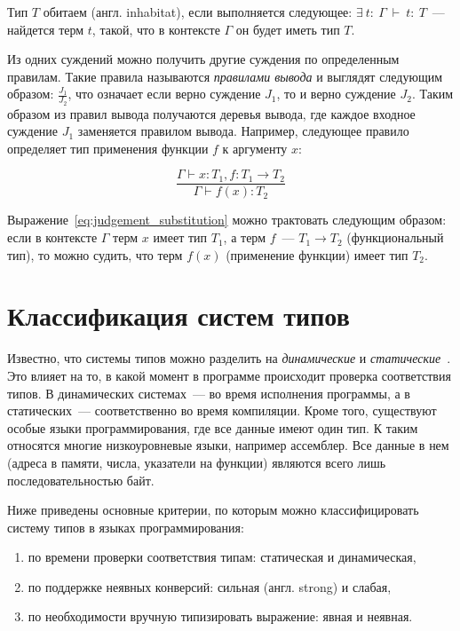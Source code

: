 Тип $T$ обитаем (англ. inhabitat), если выполняется следующее: $\exists~t:~\Gamma~\vdash~t:~T$~--- найдется терм $t$, такой, что в контексте $\Gamma$ он будет иметь тип $T$.

Из одних суждений можно получить другие суждения по определенным правилам.
Такие правила называются \textit{правилами вывода} и выглядят следующим образом: $\displaystyle \frac{J_1}{J_2}$, что означает если верно суждение $J_1$, то и верно суждение $J_2$.
Таким образом из правил вывода получаются деревья вывода, где каждое входное суждение $J_1$ заменяется правилом вывода.
Например, следующее правило определяет тип применения функции $f$ к аргументу $x$:

\begin{equation}
    \label{eq:judgement_substitution}
    \frac{\Gamma \vdash x: T_1, f: T_1 \to T_2}{\Gamma \vdash f(x): T_2}
\end{equation}

Выражение~\ref{eq:judgement_substitution} можно трактовать следующим образом: если в контексте $\Gamma$ терм $x$ имеет тип $T_1$, а терм $f$~--- $T_1 \to T_2$ (функциональный тип), то можно судить, что терм $f(x)$ (применение функции) имеет тип $T_2$.



\section{Классификация систем типов}
\label{sec:classification}

Известно, что системы типов можно разделить на \textit{динамические} и \textit{статические}~\cite{Typing}.
Это влияет на то, в какой момент в программе происходит проверка соответствия типов.
В динамических системах~--- во время исполнения программы, а в статических~--- соответственно во время компиляции.
Кроме того, существуют особые языки программирования, где все данные имеют один тип.
К таким относятся многие низкоуровневые языки, например ассемблер.
Все данные в нем (адреса в памяти, числа, указатели на функции) являются всего лишь последовательностью байт.

Ниже приведены основные критерии, по которым можно классифицировать систему типов в языках программирования:

\begin{enumerate}[1)]
    \item по времени проверки соответствия типам: статическая и динамическая,
    \item по поддержке неявных конверсий: сильная (англ. strong) и слабая,
    \item по необходимости вручную типизировать выражение: явная и неявная.
\end{enumerate}

